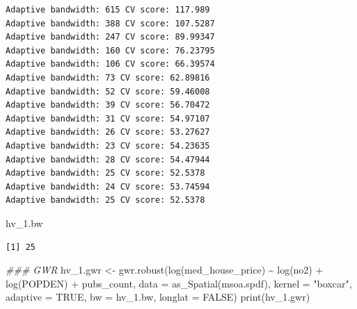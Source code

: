 \documentclass[
  letterpaper,
  DIV=11,
  numbers=noendperiod]{scrreprt}
\newenvironment{Shaded}{\begin{snugshade}}{\end{snugshade}}
\newcommand{\AttributeTok}[1]{\textcolor[rgb]{0.40,0.45,0.13}{#1}}
\newcommand{\ConstantTok}[1]{\textcolor[rgb]{0.56,0.35,0.01}{#1}}
\newcommand{\DocumentationTok}[1]{\textcolor[rgb]{0.37,0.37,0.37}{\textit{#1}}}
\newcommand{\FunctionTok}[1]{\textcolor[rgb]{0.28,0.35,0.67}{#1}}
\newcommand{\NormalTok}[1]{\textcolor[rgb]{0.00,0.23,0.31}{#1}}
\newcommand{\OtherTok}[1]{\textcolor[rgb]{0.00,0.23,0.31}{#1}}
\newcommand{\SpecialCharTok}[1]{\textcolor[rgb]{0.37,0.37,0.37}{#1}}
\newcommand{\StringTok}[1]{\textcolor[rgb]{0.13,0.47,0.30}{#1}}
\begin{document}
\begin{verbatim}
Adaptive bandwidth: 615 CV score: 117.989 
Adaptive bandwidth: 388 CV score: 107.5287 
Adaptive bandwidth: 247 CV score: 89.99347 
Adaptive bandwidth: 160 CV score: 76.23795 
Adaptive bandwidth: 106 CV score: 66.39574 
Adaptive bandwidth: 73 CV score: 62.89816 
Adaptive bandwidth: 52 CV score: 59.46008 
Adaptive bandwidth: 39 CV score: 56.70472 
Adaptive bandwidth: 31 CV score: 54.97107 
Adaptive bandwidth: 26 CV score: 53.27627 
Adaptive bandwidth: 23 CV score: 54.23635 
Adaptive bandwidth: 28 CV score: 54.47944 
Adaptive bandwidth: 25 CV score: 52.5378 
Adaptive bandwidth: 24 CV score: 53.74594 
Adaptive bandwidth: 25 CV score: 52.5378 
\end{verbatim}

\begin{Shaded}
\begin{Highlighting}[]
\NormalTok{hv\_1.bw}
\end{Highlighting}
\end{Shaded}

\begin{verbatim}
[1] 25
\end{verbatim}

\begin{Shaded}
\begin{Highlighting}[]
\DocumentationTok{\#\#\# GWR }
\NormalTok{hv\_1.gwr }\OtherTok{\textless{}{-}} \FunctionTok{gwr.robust}\NormalTok{(}\FunctionTok{log}\NormalTok{(med\_house\_price) }\SpecialCharTok{\textasciitilde{}} \FunctionTok{log}\NormalTok{(no2) }\SpecialCharTok{+} \FunctionTok{log}\NormalTok{(POPDEN) }\SpecialCharTok{+}\NormalTok{ pubs\_count,}
                      \AttributeTok{data =} \FunctionTok{as\_Spatial}\NormalTok{(msoa.spdf), }
                      \AttributeTok{kernel =} \StringTok{"boxcar"}\NormalTok{, }
                      \AttributeTok{adaptive =} \ConstantTok{TRUE}\NormalTok{, }
                      \AttributeTok{bw =}\NormalTok{ hv\_1.bw, }
                      \AttributeTok{longlat =} \ConstantTok{FALSE}\NormalTok{)}
\FunctionTok{print}\NormalTok{(hv\_1.gwr)}
\end{Highlighting}
\end{Shaded}
\end{document}
